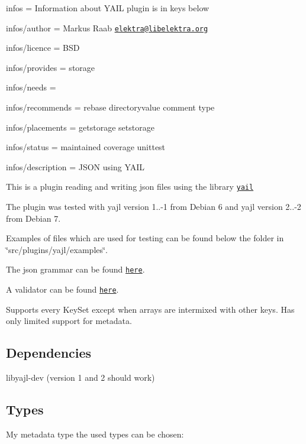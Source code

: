 
\begin{DoxyItemize}
\item infos = Information about Y\+A\+I\+L plugin is in keys below
\item infos/author = Markus Raab \href{mailto:elektra@libelektra.org}{\tt elektra@libelektra.\+org}
\item infos/licence = B\+S\+D
\item infos/provides = storage
\item infos/needs =
\item infos/recommends = rebase directoryvalue comment type
\item infos/placements = getstorage setstorage
\item infos/status = maintained coverage unittest
\item infos/description = J\+S\+O\+N using Y\+A\+I\+L
\end{DoxyItemize}

This is a plugin reading and writing json files using the library \href{http://lloyd.github.com/yajl/}{\tt yail}

The plugin was tested with yajl version 1..-\/1 from Debian 6 and yajl version 2..-\/2 from Debian 7.

Examples of files which are used for testing can be found below the folder in \char`\"{}src/plugins/yajl/examples\char`\"{}.

The json grammar can be found \href{http://www.ietf.org/rfc/rfc4627.txt}{\tt here}.

A validator can be found \href{http://jsonlint.com/}{\tt here}.

Supports every Key\+Set except when arrays are intermixed with other keys. Has only limited support for metadata.

\subsection*{Dependencies}


\begin{DoxyItemize}
\item {\ttfamily libyajl-\/dev} (version 1 and 2 should work)
\end{DoxyItemize}

\subsection*{Types}

My metadata {\ttfamily type} the used types can be chosen\+:



